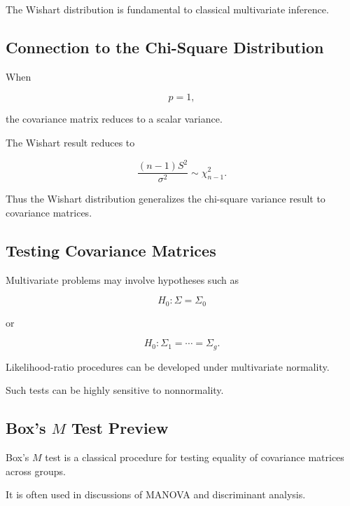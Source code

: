 The Wishart distribution is fundamental to classical multivariate
inference.

\subsection{Connection to the Chi-Square Distribution}
\label{subsec:wishart-chi-square-connection}

When

\[
p=1,
\]

the covariance matrix reduces to a scalar variance.

The Wishart result reduces to

\[
\boxed{
\frac{
(n-1)S^2
}{
\sigma^2
}
\sim
\chi^2_{n-1}.
}
\]

Thus the Wishart distribution generalizes the chi-square variance result
to covariance matrices.

\subsection{Testing Covariance Matrices}
\label{subsec:testing-covariance-matrices}

Multivariate problems may involve hypotheses such as

\[
\boxed{
H_0:
\Sigma=\Sigma_0
}
\]

or

\[
\boxed{
H_0:
\Sigma_1=\cdots=\Sigma_g.
}
\]

Likelihood-ratio procedures can be developed under multivariate
normality.

Such tests can be highly sensitive to nonnormality.

\subsection{Box's \(M\) Test Preview}
\label{subsec:box-m-test-preview}

Box's \(M\) test is a classical procedure for testing equality of
covariance matrices across groups.

It is often used in discussions of MANOVA and discriminant analysis.

